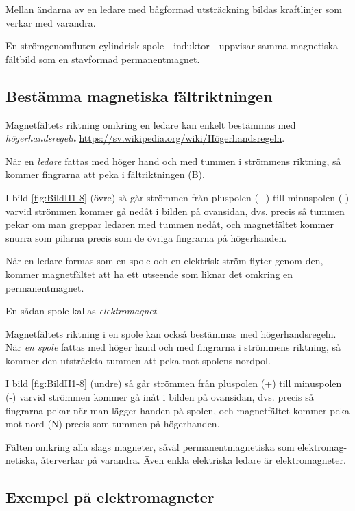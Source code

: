 Mellan ändarna av en ledare med bågformad utsträckning bildas kraftlinjer som
verkar med varandra.

En strömgenomfluten cylindrisk spole - induktor - uppvisar samma magnetiska
fältbild som en stavformad permanentmagnet.

\subsection{Bestämma magnetiska fältriktningen}

Magnetfältets riktning omkring en ledare kan enkelt bestämmas med
\emph{högerhandsregeln}
\url{https://sv.wikipedia.org/wiki/Högerhandsregeln}.

När en \emph{ledare} fattas med höger hand och med tummen i strömmens
riktning, så kommer fingrarna att peka i fältriktningen (B).

I bild \ref{fig:BildII1-8} (övre) så går strömmen från pluspolen (+) till
minuspolen (-) varvid strömmen kommer gå nedåt i bilden på ovansidan,
dvs. precis så tummen pekar om man greppar ledaren med tummen nedåt, och
magnetfältet kommer snurra som pilarna precis som de övriga fingrarna på
högerhanden.

När en ledare formas som en spole och en elektrisk ström flyter genom den,
kommer magnetfältet att ha ett utseende som liknar det omkring en
permanentmagnet.

En sådan spole kallas \emph{elektromagnet}.

Magnetfältets riktning i en spole kan också bestämmas med högerhandsregeln.
När \emph{en spole} fattas med höger hand och med fingrarna i strömmens
riktning, så kommer den utsträckta tummen att peka mot spolens nordpol.

I bild \ref{fig:BildII1-8} (undre) så går strömmen från pluspolen (+) till minuspolen
(-) varvid strömmen kommer gå inåt i bilden på ovansidan, dvs. precis så
fingrarna pekar när man lägger handen på spolen, och magnetfältet kommer peka
mot nord (N) precis som tummen på högerhanden.

Fälten omkring alla slags magneter, såväl permanentmagnetiska som elektromag-
netiska, återverkar på varandra. Även enkla
elektriska ledare är elektromagneter.

\clearpage

\subsection{Exempel på elektromagneter}


